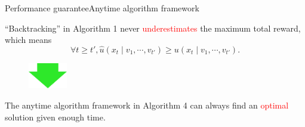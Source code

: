\begin{frame}{Performance guarantee}{Anytime algorithm framework}
	
	\begin{lemma}
		“Backtracking” in Algorithm 1 never \textcolor{red}{underestimates}
		the maximum total reward, which means
		\begin{equation}
		\nonumber
		\forall t \geq t', \hat{u}(x_{t} \mid v_{1} , \cdots , v_{t'}) \geq u(x_{t} \mid v_{1} , \cdots , v_{t'}).
		\end{equation}
	\end{lemma}
	
	\begin{minipage}{\textwidth}
		\begin{figure}
			\centering
			\includegraphics[width = 0.15\textwidth]{./figure/arrow}
		\end{figure}
	\end{minipage}
	
	\begin{theorem}
		The anytime algorithm framework in Algorithm 4 can always find an \textcolor{red}{optimal} solution given enough time.
	\end{theorem}
	
\end{frame}
